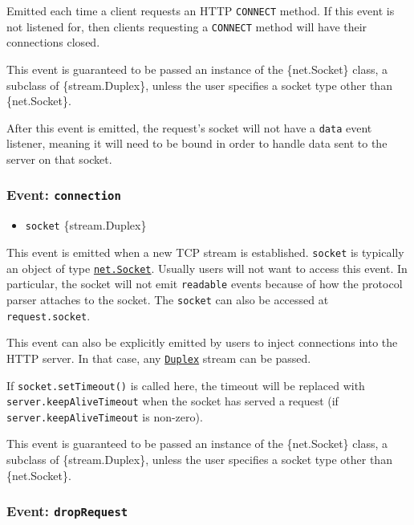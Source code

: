 Emitted each time a client requests an HTTP \texttt{CONNECT} method. If
this event is not listened for, then clients requesting a
\texttt{CONNECT} method will have their connections closed.

This event is guaranteed to be passed an instance of the \{net.Socket\}
class, a subclass of \{stream.Duplex\}, unless the user specifies a
socket type other than \{net.Socket\}.

After this event is emitted, the request's socket will not have a
\texttt{\textquotesingle{}data\textquotesingle{}} event listener,
meaning it will need to be bound in order to handle data sent to the
server on that socket.

\subsubsection{\texorpdfstring{Event:
\texttt{\textquotesingle{}connection\textquotesingle{}}}{Event: \textquotesingle connection\textquotesingle{}}}\label{event-connection}

\begin{itemize}
\tightlist
\item
  \texttt{socket} \{stream.Duplex\}
\end{itemize}

This event is emitted when a new TCP stream is established.
\texttt{socket} is typically an object of type
\href{net.md\#class-netsocket}{\texttt{net.Socket}}. Usually users will
not want to access this event. In particular, the socket will not emit
\texttt{\textquotesingle{}readable\textquotesingle{}} events because of
how the protocol parser attaches to the socket. The \texttt{socket} can
also be accessed at \texttt{request.socket}.

This event can also be explicitly emitted by users to inject connections
into the HTTP server. In that case, any
\href{stream.md\#class-streamduplex}{\texttt{Duplex}} stream can be
passed.

If \texttt{socket.setTimeout()} is called here, the timeout will be
replaced with \texttt{server.keepAliveTimeout} when the socket has
served a request (if \texttt{server.keepAliveTimeout} is non-zero).

This event is guaranteed to be passed an instance of the \{net.Socket\}
class, a subclass of \{stream.Duplex\}, unless the user specifies a
socket type other than \{net.Socket\}.

\subsubsection{\texorpdfstring{Event:
\texttt{\textquotesingle{}dropRequest\textquotesingle{}}}{Event: \textquotesingle dropRequest\textquotesingle{}}}\label{event-droprequest}

